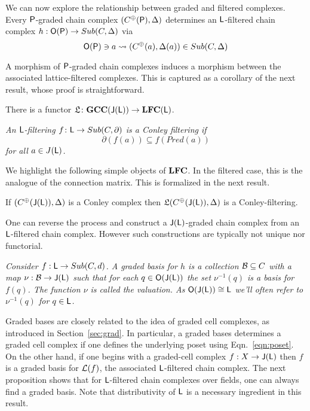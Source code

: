   
 We can now explore the relationship between graded and filtered complexes.  Every ${\mathsf P}$-graded chain complex $(C^\oplus({\mathsf P}),\Delta)$ determines an ${\mathsf L}$-filtered chain complex $h:{\mathsf O}({\mathsf P})\to Sub(C,\Delta)$ via $${\mathsf O}({\mathsf P})\ni a \rightsquigarrow (C^\oplus(a),\Delta(a))\in Sub(C,\Delta)$$


A morphism of ${\mathsf P}$-graded chain complexes induces a morphism between the associated lattice-filtered complexes.  This is captured as a corollary of the next result, whose proof is straightforward.


\begin{prop}
There is a functor $\mathfrak{L}\colon {\bf GCC}({\mathsf J}({\mathsf L}))\to {\bf LFC}({\mathsf L})$.
\end{prop}




\begin{defn}
{\em 
An ${\mathsf L}$-filtering $f\colon {\mathsf L} \to Sub(C,\partial)$ is a \em{Conley filtering} if
\[
\partial(f(a)) \subseteq f(Pred(a))
\]
for all $a\in J({\mathsf L})$.
}
\end{defn}


We highlight the following simple objects of ${\bf LFC}$. In the filtered case, this is the analogue of the connection matrix.  This is formalized in the next result.


\begin{prop}
If $(C^\oplus({\mathsf J}({\mathsf L})),\Delta)$ is a Conley complex then $\mathfrak{L}(C^\oplus({\mathsf J}({\mathsf L})),\Delta)$ is a Conley-filtering.
\end{prop}



One can reverse the process and construct a ${\mathsf J}({\mathsf L})$-graded chain complex from an ${\mathsf L}$-filtered chain complex.  However such constructions are typically not unique nor functorial.


\begin{defn}
{\em
Consider $f:{\mathsf L}\to Sub(C,d)$.  A {\em graded basis for $h$} is a collection ${\mathcal B}\subseteq C$ with a map $\nu:{\mathcal B}\to {\mathsf J}({\mathsf L})$ such that for each $q\in {\mathsf O}({\mathsf J}({\mathsf L}))$ the set $\nu^{-1}(q)$ is a basis for $f(q)$.
 The function $\nu$ is called the {\em valuation}. As ${\mathsf O}({\mathsf J}({\mathsf L})) \cong {\mathsf L}$ we'll often refer to $\nu^{-1}(q)$ for $q\in {\mathsf L}$.  
}
\end{defn}

Graded bases are closely related to the idea of graded cell complexes, as introduced in Section~\ref{sec:grad}.  In particular, a graded bases determines a graded cell complex if one defines the underlying poset using Eqn.~\ref{eqn:poset}.  On the other hand, if one begins with a graded-cell complex $f:X\to {\mathsf J}({\mathsf L})$ then $f$ is a graded basis for ${\mathcal L}(f)$, the associated ${\mathsf L}$-filtered chain complex.   The next proposition shows that for ${\mathsf L}$-filtered chain complexes over fields, one can always find a graded basis.  Note that distributivity of ${\mathsf L}$ is a necessary ingredient in this result.

